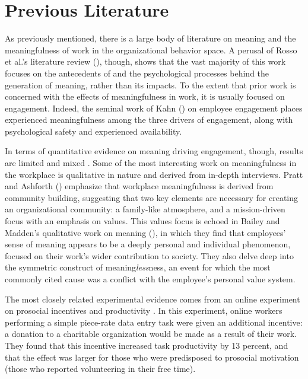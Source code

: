 \documentclass[12pt]{article}
\begin{document}
\section{Previous Literature}

As previously mentioned, there is a large body of literature on meaning and the meaningfulness of work in the organizational behavior space. A perusal of Rosso et al.'s literature review (\citeyear{Rosso:10}), though, shows that the vast majority of this work focuses on the antecedents of and the psychological processes behind the generation of meaning, rather than its impacts. To the extent that prior work is concerned with the effects of meaningfulness in work, it is usually focused on engagement. Indeed, the seminal work of Kahn (\citeyear{Kahn:90}) on employee engagement places experienced meaningfulness among the three drivers of engagement, along with psychological safety and experienced availability.

In terms of quantitative evidence on meaning driving engagement, though, results are limited and mixed  \citep{Bailey:17}. Some of the most interesting work on meaningfulness in the workplace is qualitative in nature and derived from in-depth interviews. Pratt and Ashforth (\citeyear{Pratt:03}) emphasize that workplace meaningfulness is derived from community building, suggesting that two key elements are necessary for creating an organizational community: a family-like atmosphere, and a mission-driven focus with an emphasis on values. This values focus is echoed in Bailey and Madden's qualitative work on meaning (\citeyear{Bailey:16}), in which they find that employees' sense of meaning appears to be a deeply personal and individual phenomenon, focused on their work's wider contribution to society. They also delve deep into the symmetric construct of meaning\textit{less}ness, an event for which the most commonly cited cause was a conflict with the employee's personal value system.

The most closely related experimental evidence comes from an online experiment on prosocial incentives and productivity \citep{Tonin:15} . In this experiment, online workers performing a simple piece-rate data entry task were given an additional incentive: a donation to a charitable organization would be made as a result of their work. They found that this incentive increased task productivity by 13 percent, and that the effect was larger for those who were predisposed to prosocial motivation (those who reported volunteering in their free time). 
\end{document}
